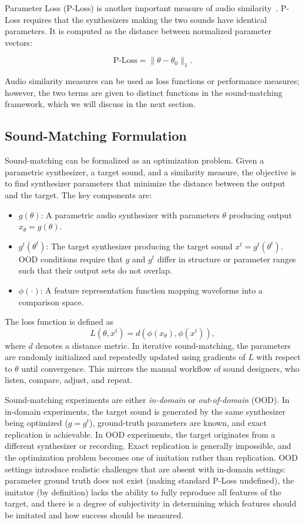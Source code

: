 \documentclass[10pt]{article} %
\begin{document}
Parameter Loss (P-Loss) is another important measure of audio similarity~\cite{yee2018automatic,esling2019flow,masuda2021soundmatch}. P-Loss requires that the synthesizers making the two sounds have identical parameters. It is computed as the distance between normalized parameter vectors:

\begin{equation}
\text{P-Loss} = \|\theta - \theta_0\|_1.
\end{equation}


Audio similarity measures can be used as loss functions or performance measures; however, the two terms are given to distinct functions in the sound-matching framework, which we will discuss in the next section. 

\subsection{Sound-Matching Formulation}

Sound-matching can be formalized as an optimization problem. Given a parametric synthesizer, a target sound, and a similarity measure, the objective is to find synthesizer parameters that minimize the distance between the output and the target. The key components are:

\begin{itemize}
\item $g(\theta)$: A parametric audio synthesizer with parameters $\theta$ producing output $x_{\theta} = g(\theta)$.
\item $g^{t}(\theta^{t})$: The target synthesizer producing the target sound $x^{t} = g^{t}(\theta^{t})$. OOD conditions require that $g$ and $g^{t}$ differ in structure or parameter ranges such that their output sets do not overlap.
\item $\phi(\cdot)$: A feature representation function mapping waveforms into a comparison space.
\end{itemize}

The loss function is defined as
\[
L(\theta, x^{t}) = d(\phi(x_{\theta}), \phi(x^{t})),
\]
where $d$ denotes a distance metric. In iterative sound-matching, the parameters are randomly initialized and repeatedly updated using gradients of $L$ with respect to $\theta$ until convergence. This mirrors the manual workflow of sound designers, who listen, compare, adjust, and repeat. 

Sound-matching experiments are either \emph{in-domain} or \emph{out-of-domain} (OOD). In in-domain experiments, the target sound is generated by the same synthesizer being optimized ($g = g^{t}$), ground-truth parameters are known, and exact replication is achievable. In OOD experiments, the target originates from a different synthesizer or recording. Exact replication is generally impossible, and the optimization problem becomes one of imitation rather than replication. OOD settings introduce realistic challenges that are absent with in-domain settings: parameter ground truth does not exist (making standard P-Loss undefined), the imitator (by definition) lacks the ability to fully reproduce all features of the target, and there is a degree of subjectivity in determining which features should be imitated and how success should be measured. 
\end{document}
